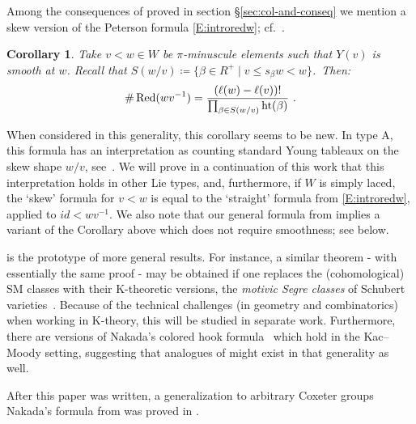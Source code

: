 \documentclass[11pt]{article}
\newtheorem{corol}[theo]{Corollary}
\theoremstyle{definition}
\numberwithin{equation}{section}
\newcommand{\h}{\mathrm{ht}}
\DeclareMathOperator{\Red}{Red}
\begin{document}
Among the consequences of  proved in section \S\ref{sec:col-and-conseq} 
we mention a skew version of the Peterson formula \eqref{E:introredw}; cf.~.
\begin{corol} Take $v <w\in W$ be $\pi$-minuscule elements 
	such that $Y(v)$ is smooth at $w$. Recall that 
	$S(w/v)\coloneqq \{\beta\in R^+\mid v\le s_\beta w<w\}$.~Then:
	\begin{equation}\label{equ:petersonproctor-intro}
		\#\Red(wv^{-1})=\frac{(\ell(w)-\ell(v))!}{\prod_{\beta\in S(w/v)}\h(\beta)} ~\/.
	\end{equation}
\end{corol}
When considered in this generality, this corollary seems to be new. In type A, this formula has an interpretation as counting standard Young tableaux on the skew shape $w/v$, see~\cite{naruse2014schubert,morales.pak.panovaLhook,panova.petrov:hook}.
We will prove in a continuation of this work that this interpretation holds in other Lie types, and, furthermore, if $W$ is simply laced, the `skew' formula
	for $v<w$ is equal to the `straight' formula from \eqref{E:introredw}, applied to $id < wv^{-1}$.
	We also note that our general formula from  implies a variant of the Corollary above
	which does not require smoothness; see  below.

 is the prototype of more general results. For instance,
a similar theorem - with essentially the same proof - may be obtained if one replaces the (cohomological) SM classes
with their K-theoretic versions, the {\em motivic Segre classes} of Schubert varieties~\cite{AMSS:motivic,mihalcea2020left}.
Because of the
technical challenges (in geometry and combinatorics) when working in K-theory, this will be studied
in separate work. Furthermore, there are versions of
Nakada's colored hook formula~\cite{nakada:colored} which hold in the Kac--Moody setting, 
suggesting that analogues of  
 might exist in that generality as well.\begin{footnote} 
{After this paper was written, a generalization to arbitrary Coxeter groups Nakada's formula from  was proved in
\cite{MNS24Coxeterhook}.}\end{footnote}
\end{document}

